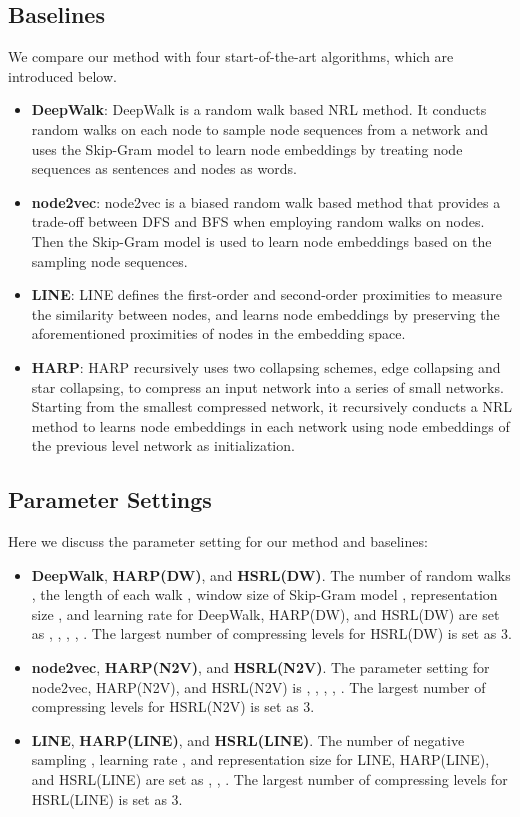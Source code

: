 \documentclass[conference]{IEEEtran}
\begin{document}
\subsection{Baselines}
We compare our method with four start-of-the-art algorithms, which are introduced below. 
\begin{itemize}
    \item \textbf{DeepWalk}: DeepWalk is a random walk based NRL method. It conducts random walks on each node to sample node sequences from a network and uses the Skip-Gram model to learn node embeddings by treating node sequences as sentences and nodes as words.
    
    \item \textbf{node2vec}: node2vec is a biased random walk based method that provides a trade-off between DFS and BFS when employing random walks on nodes. Then the Skip-Gram model is used to learn node embeddings based on the sampling node sequences.
    
    \item \textbf{LINE}: LINE defines the first-order and second-order proximities to measure the similarity between nodes, and learns node embeddings by preserving the aforementioned proximities of nodes in the embedding space.
    
    \item \textbf{HARP}: HARP recursively uses two collapsing schemes, edge collapsing and star collapsing, to compress an input network into a series of small networks. Starting from the smallest compressed network, it recursively conducts a NRL method to learns node embeddings in each network using node embeddings of the previous level network as initialization.
\end{itemize}

\subsection{Parameter Settings}
Here we discuss the parameter setting for our method and baselines:
\begin{itemize}
    \item \textbf{DeepWalk}, \textbf{HARP(DW)}, and \textbf{HSRL(DW)}. The number of random walks , the length of each walk , window size of Skip-Gram model , representation size , and learning rate  for DeepWalk, HARP(DW), and HSRL(DW) are set as , , , , . The largest number of compressing levels for HSRL(DW)  is set as 3.
    
    \item \textbf{node2vec}, \textbf{HARP(N2V)}, and \textbf{HSRL(N2V)}. The parameter setting for node2vec, HARP(N2V), and HSRL(N2V) is , , , , . The largest number of compressing levels for HSRL(N2V)  is set as 3.
    
    \item \textbf{LINE}, \textbf{HARP(LINE)}, and \textbf{HSRL(LINE)}. The number of negative sampling , learning rate , and representation size  for LINE, HARP(LINE), and HSRL(LINE) are set as , , . The largest number of compressing levels for HSRL(LINE)  is set as 3.
\end{itemize}
\end{document}
